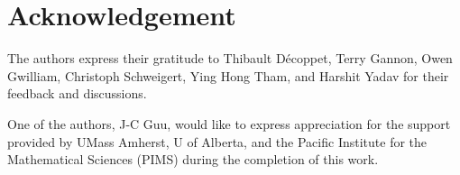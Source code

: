 \section*{Acknowledgement}

The authors express their gratitude to Thibault Décoppet, Terry Gannon, Owen
Gwilliam, Christoph Schweigert, Ying Hong Tham, and Harshit Yadav for their
feedback and discussions.

One of the authors, J-C Guu, would like to express appreciation for the support
provided by UMass Amherst, U of Alberta, and the Pacific Institute for the
Mathematical Sciences (PIMS) during the completion of this work.
